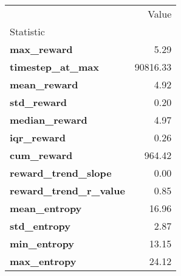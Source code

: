 \begin{tabular}{lr}
\toprule
 & Value \\
Statistic &  \\
\midrule
\textbf{max\_reward} & 5.29 \\
\textbf{timestep\_at\_max} & 90816.33 \\
\textbf{mean\_reward} & 4.92 \\
\textbf{std\_reward} & 0.20 \\
\textbf{median\_reward} & 4.97 \\
\textbf{iqr\_reward} & 0.26 \\
\textbf{cum\_reward} & 964.42 \\
\textbf{reward\_trend\_slope} & 0.00 \\
\textbf{reward\_trend\_r\_value} & 0.85 \\
\textbf{mean\_entropy} & 16.96 \\
\textbf{std\_entropy} & 2.87 \\
\textbf{min\_entropy} & 13.15 \\
\textbf{max\_entropy} & 24.12 \\
\bottomrule
\end{tabular}
